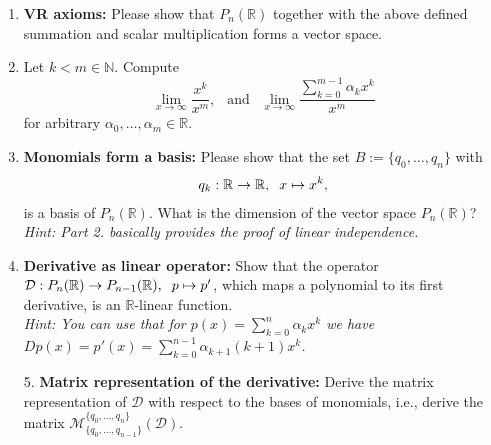 \begin{enumerate}
	\item \textbf{VR axioms:} Please show that $ P_n(\mathbb{R})$ together with the above defined summation and scalar multiplication forms a vector space.
	\item Let $k<m \in \mathbb{N}$. Compute 
	$$
	\lim\limits_{x\rightarrow\infty} \frac{x^k}{x^m}, ~~\text{ and }~~ \lim\limits_{x\rightarrow\infty}  \frac{\sum_{k=0}^{m-1}\alpha_k x^k}{x^m}
	$$
	for arbitrary $\alpha_0, \dots, \alpha_m \in \mathbb{R}$.
	\item \textbf{Monomials form a basis:} Please show that the set $B := \lbrace q_0, \dots, q_n \rbrace$ with
	\begin{align*}
	q_k: \mathbb{R} \rightarrow \mathbb{R}, \hspace{.2cm} x \mapsto x^k,
	\end{align*} 
	is a basis of $P_n(\mathbb{R})$. What is the dimension of the vector space $P_n(\mathbb{R})$?
	\textit{Hint:  Part 2. basically provides the proof of linear independence.}
	\item \textbf{Derivative as linear operator:} Show that the operator $\mathcal{D}:P_n(\mathbb{R}) \rightarrow P_{n-1}(\mathbb{R}), \hspace{.2cm} p \mapsto p'$, 
	which maps a polynomial to its first derivative, is an $\mathbb{R}$-linear function.\\
	\textit{Hint:  You can use that for $p(x) = \sum_{k=0}^n \alpha_k x^k$ we have $Dp(x)=p'(x) = \sum_{k=0}^{n-1} \alpha_{k+1} (k+1)x^k$. }					
	
	\item[5.] \textbf{Matrix representation of the derivative:} Derive the matrix representation of $\mathcal{D}$ with respect to the bases of monomials, i.e., derive the matrix $\mathcal{M}^{\{q_0,\ldots,q_n\}}_{\{q_0,\ldots,q_{n-1}\}}(\mathcal{D})$.
	
	
	
\end{enumerate}